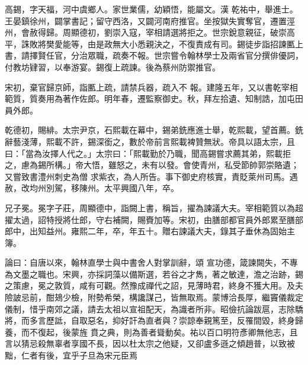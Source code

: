 \begin{pinyinscope}
 高錫，字天福，河中虞鄉人。家世業儒，幼穎悟，能屬文。漢
 乾祐中，舉進士。王晏鎮徐州，闢掌書記；留守西洛，又闢河南府推官。坐按獄失實奪官，遷置涇州，會赦得歸。周顯德初，劉崇入寇，宰相請選將拒之。世宗銳意親征，破崇高平，誅敗將樊愛能等，由是政無大小悉親決之，不復責成有司。錫徒步詣招諫匭上書，請擇賢任官，分治眾職，疏奏不報。世宗嘗令翰林學士及兩省官分撰俳優詞，付教坊肄習，以奉游宴。錫復上疏諫。後為蔡州防禦推官。



 宋初，棄官歸京師，詣匭上疏，請禁兵器，疏入不
 報。建隆五年，又以書乾宰相範質，質奏用為著作佐郎。明年春，遷監察御史。秋，拜左拾遺、知制誥，加屯田員外郎。



 乾德初，賜緋。太宗尹京，石熙載在幕中，錫弟銑應進士舉，乾熙載，望首薦。銑辭藝淺薄，熙載不許，錫深銜之，數於帝前言熙載裨贊無狀。帝具以語太宗，且曰：「當為汝擇人代之。」太宗曰：「熙載勤於乃職，聞高錫嘗求薦其弟，熙載拒之，慮為錫所構。」帝大悟，雖怒之，未有以發。會使青州，私受節帥郭崇賂遺；又嘗致書澧州刺史為僧
 求紫衣，為人所告。事下御史府核實，責貶萊州司馬。遇赦，改均州別駕，移陳州。太平興國八年，卒。



 兄子冕。冕字子莊，周顯德中，詣闕上書，稱旨，擢為諫議大夫。宰相範質以為超擢太過，詔特授將仕郎，守右補闕，賜賚加等。宋初，由膳部都官員外郎累至膳部郎中，出知益州。雍熙二年，卒，年五十。贈右諫議大夫，錄其子垂休為固始主簿。



 論曰：自唐以來，翰林直學士與中書舍人對掌訓辭，頌
 宣功德，箴諫闕失，不專為文墨之職也。宋興，亦採詞藻以備斯選，若谷之才雋，著之敏達，澹之治跡，錫之策慮，冕之敦質，咸有可觀。然豫成禪代之詔，見薄時君，終身不獲大用。及夫險詖忌前，酣鳷少檢，附勢希榮，構讒謀己，皆無取焉。蒙博洽長厚，繼竇儀裁定儀制，惜乎南郊之議，請去太祖以宣祖配天，為識者所非。昭儉抗論跋扈，志除驕將，而多言歷詆，自取惡名，抑好訐為直者與？崇諒奉親篤至，反罹間毀，終身歸養，而不復起，後蒙旌
 賁之典，則為善者聳動矣。祐以百口明符彥卿無他志，且言以猜忌殺無辜者享國不長，因以杜太宗之他疑，又卻盧多遜之傾趙普，以致被黜，仁者有後，宜乎子旦為宋元臣焉



\end{pinyinscope}